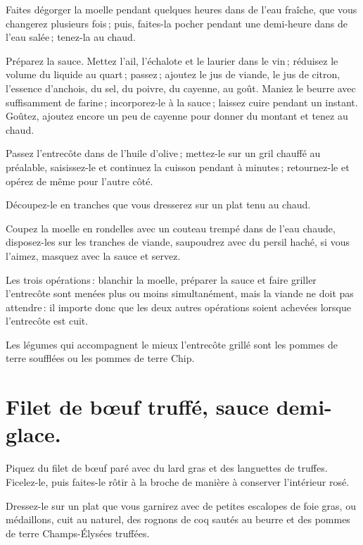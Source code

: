 Faites dégorger la moelle pendant quelques heures dans de l'eau fraîche, que
vous changerez plusieurs fois ; puis, faites-la pocher pendant une demi-heure
dans de l’eau salée ; tenez-la au chaud.

Préparez la sauce. Mettez l'ail, l'échalote et le laurier dans le vin ;
réduisez le volume du liquide au quart ; passez ; ajoutez le jus de viande, le
jus de citron, l'essence d'anchois, du sel, du poivre, du cayenne, au goût.
Maniez le beurre avec suffisamment de farine ; incorporez-le à la sauce ;
laissez cuire pendant un instant. Goûtez, ajoutez encore un peu de cayenne pour
donner du montant et tenez au chaud.

Passez l'entrecôte dans de l'huile d'olive ; mettez-le sur un gril chauffé au
préalable, saisissez-le et continuez la cuisson pendant {\mmm}
à {\mmm} minutes ; retournez-le et opérez de même pour l'autre côté.

Découpez-le en tranches que vous dresserez sur un plat tenu au chaud.

Coupez la moelle en rondelles avec un couteau trempé dans de l’eau chaude,
disposez-les sur les tranches de viande, saupoudrez avec du persil haché, si
vous l'aimez, masquez avec la sauce et servez.

Les trois opérations : blanchir la moelle, préparer la sauce et faire griller
l'entrecôte sont menées plus ou moins simultanément, mais la viande ne doit pas
attendre : il importe donc que les deux autres opérations soient achevées
lorsque l’entrecôte est cuit.

Les légumes qui accompagnent le mieux l'entrecôte grillé sont les pommes de
terre soufflées ou les pommes de terre Chip.

\section*{\centering Filet de bœuf truffé, sauce demi-glace.}
{}

Piquez du filet de bœuf paré avec du lard gras et des languettes de truffes.
Ficelez-le, puis faites-le rôtir à la broche de manière à conserver l'intérieur
rosé.

Dressez-le sur un plat que vous garnirez avec de petites escalopes de foie
gras, ou médaillons, cuit au naturel, des rognons de coq sautés au beurre et
des pommes de terre Champs-Élysées truffées.

